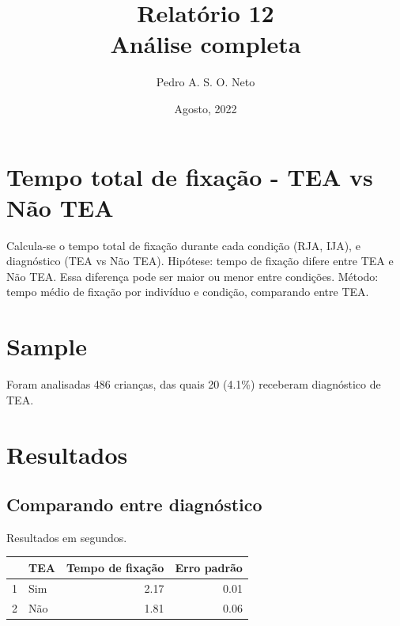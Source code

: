 \documentclass{article}
\title{Relatório 12 \\ Análise completa}
\author{Pedro A. S. O. Neto}
\date{Agosto, 2022}
\begin{document}
\maketitle

\section{Tempo total de fixação - TEA vs Não TEA}

Calcula-se o tempo total de fixação durante cada condição (RJA, IJA), e diagnóstico (TEA vs Não TEA). Hipótese: tempo de fixação difere entre TEA e Não TEA. Essa diferença pode ser maior ou menor entre condições. Método: tempo médio de fixação por indivíduo e condição, comparando entre TEA.

\section{Sample}

Foram analisadas 486 crianças, das quais 20 (4.1\%) receberam diagnóstico de TEA.


\section{Resultados}

\subsection{Comparando entre diagnóstico}

Resultados em segundos.

\begin{table}[ht]
\centering
\begin{tabular}{rlrr}
  \hline
  & TEA & Tempo de fixação & Erro padrão \\
  \hline
  1 & Sim & 2.17 & 0.01 \\
  2 & Não & 1.81 & 0.06 \\
  \hline
\end{tabular}
\end{table}
\end{document}
